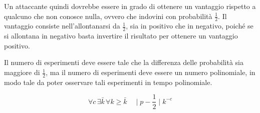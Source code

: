 Un attaccante quindi dovrebbe essere in grado di ottenere un vantaggio rispetto 
a qualcuno che non conosce nulla, ovvero che indovini con probabilità $\frac{1}{2}$.
Il vantaggio consiste nell'allontanarsi da $\frac{1}{2}$, sia in positivo che in negativo, 
poiché se si allontana in negativo basta invertire il risultato per ottenere
un vantaggio positivo.

Il numero di esperimenti deve essere tale che la differenza delle probabilità sia
maggiore di $\frac{1}{2}$, ma il numero di esperimenti deve essere un numero 
polinomiale, in modo tale da poter osservare tali esperimenti in tempo polinomiale.
\begin{tcolorbox}[title = Sicurezza]
  \begin{equation}
    \forall c \, \exists \bar{k} \, \forall k \geq \bar{k} \quad \mid p - \frac{1}{2} \mid k^{-c}
  \end{equation}
\end{tcolorbox}